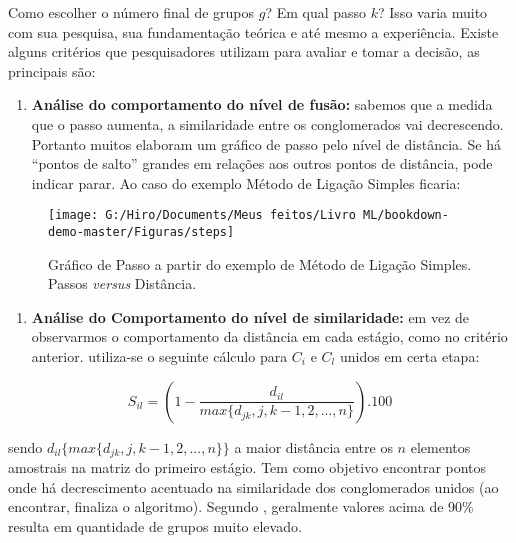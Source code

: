 \documentclass[
  openany]{book}
\providecommand{\tightlist}{%
  \setlength{\itemsep}{0pt}\setlength{\parskip}{0pt}}
\begin{document}
Como escolher o número final de grupos \(g\)? Em qual passo \(k\)? Isso varia muito com sua pesquisa, sua fundamentação teórica e até mesmo a experiência. Existe alguns critérios que pesquisadores utilizam para avaliar e tomar a decisão, as principais são:

\begin{enumerate}
\def\labelenumi{\arabic{enumi}.}
\tightlist
\item
  \textbf{Análise do comportamento do nível de fusão:} sabemos que a medida que o passo aumenta, a similaridade entre os conglomerados vai decrescendo. Portanto muitos elaboram um gráfico de passo pelo nível de distância. Se há ``pontos de salto'' grandes em relações aos outros pontos de distância, pode indicar parar. Ao caso do exemplo Método de Ligação Simples ficaria:
\end{enumerate}

\begin{figure}

{\centering \texttt{[image: G:/Hiro/Documents/Meus feitos/Livro ML/bookdown-demo-master/Figuras/steps]} 

}

\caption{Gráfico de Passo a partir do exemplo de Método de Ligação Simples. Passos \emph{versus} Distância.}\label{fig:steps}
\end{figure}



\begin{enumerate}
\def\labelenumi{\arabic{enumi}.}
\setcounter{enumi}{1}
\tightlist
\item
  \textbf{Análise do Comportamento do nível de similaridade:} em vez de observarmos o comportamento da distância em cada estágio, como no critério anterior. utiliza-se o seguinte cálculo para \(C_i\) e \(C_l\) unidos em certa etapa:
\end{enumerate}

\begin{equation}
S_{il}=(1-\frac{d_{il}}{max\{d_{jk},j,k-1,2,...,n\}}).100
 \label{eq:critsimi}
\end{equation}

sendo \(d_{il}\{max\{d_{jk},j,k-1,2,...,n\}\}\) a maior distância entre os \(n\) elementos amostrais na matriz do primeiro estágio. Tem como objetivo encontrar pontos onde há decrescimento acentuado na similaridade dos conglomerados unidos (ao encontrar, finaliza o algoritmo). Segundo \citet{felix2004}, geralmente valores acima de 90\% resulta em quantidade de grupos muito elevado.
\end{document}
